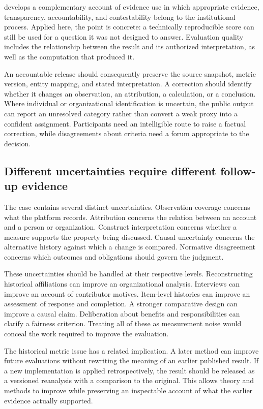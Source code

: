\citet{parkhurst2017} develops a complementary account of evidence use in which appropriate evidence, transparency, accountability, and contestability belong to the institutional process. Applied here, the point is concrete: a technically reproducible score can still be used for a question it was not designed to answer. Evaluation quality includes the relationship between the result and its authorized interpretation, as well as the computation that produced it.

An accountable release should consequently preserve the source snapshot, metric version, entity mapping, and stated interpretation. A correction should identify whether it changes an observation, an attribution, a calculation, or a conclusion. Where individual or organizational identification is uncertain, the public output can report an unresolved category rather than convert a weak proxy into a confident assignment. Participants need an intelligible route to raise a factual correction, while disagreements about criteria need a forum appropriate to the decision.

\subsection{Different uncertainties require different follow-up evidence}
The case contains several distinct uncertainties. Observation coverage concerns what the platform records. Attribution concerns the relation between an account and a person or organization. Construct interpretation concerns whether a measure supports the property being discussed. Causal uncertainty concerns the alternative history against which a change is compared. Normative disagreement concerns which outcomes and obligations should govern the judgment.

These uncertainties should be handled at their respective levels. Reconstructing historical affiliations can improve an organizational analysis. Interviews can improve an account of contributor motives. Item-level histories can improve an assessment of response and completion. A stronger comparative design can improve a causal claim. Deliberation about benefits and responsibilities can clarify a fairness criterion. Treating all of these as measurement noise would conceal the work required to improve the evaluation.

The historical metric issue has a related implication. A later method can improve future evaluations without rewriting the meaning of an earlier published result. If a new implementation is applied retrospectively, the result should be released as a versioned reanalysis with a comparison to the original. This allows theory and methods to improve while preserving an inspectable account of what the earlier evidence actually supported.

